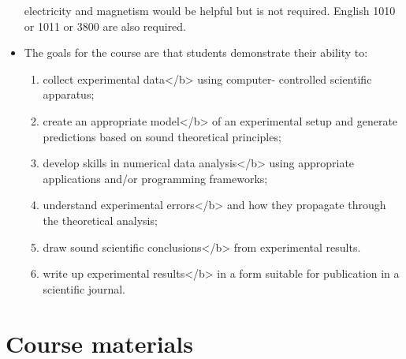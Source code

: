 \documentclass{revtex4}
\begin{document}
\begin{itemize}
electricity and magnetism would be helpful but is not required. English 1010
or 1011 or 3800 are also required.
\item
The goals for the course are that students demonstrate their ability to:
\begin{enumerate}
\item
collect experimental data</b> using computer-
controlled scientific apparatus;
\item
create an appropriate model</b> of an experimental
setup and generate predictions based on sound theoretical
principles;
\item
develop skills in numerical data analysis</b> using
appropriate applications and/or programming frameworks;
\item
understand experimental errors</b> and how they
propagate through the theoretical analysis;
\item
draw sound scientific conclusions</b> from
experimental results.
\item
write up experimental results</b> in a form suitable
for publication in a scientific journal.
\end{enumerate}
\end{itemize}

\section{Course materials}
\end{document}
